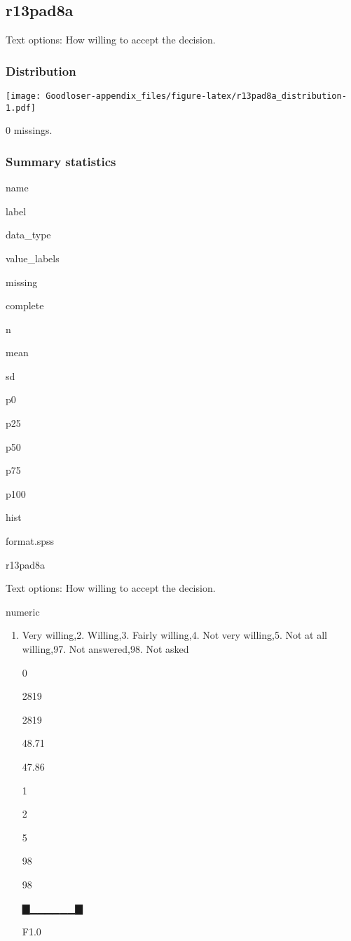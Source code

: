 \documentclass[]{book}
\providecommand{\tightlist}{%
  \setlength{\itemsep}{0pt}\setlength{\parskip}{0pt}}
\begin{document}
\subsection{r13pad8a}\label{r13pad8a}

Text options: How willing to accept the decision.

\subsubsection{Distribution}\label{r13pad8a_distribution}

\texttt{[image: Goodloser-appendix\_files/figure-latex/r13pad8a\_distribution-1.pdf]}

0 missings.

\subsubsection{Summary statistics}\label{r13pad8a_summary}

name

label

data\_type

value\_labels

missing

complete

n

mean

sd

p0

p25

p50

p75

p100

hist

format.spss

r13pad8a

Text options: How willing to accept the decision.

numeric

\begin{enumerate}
\def\labelenumi{\arabic{enumi}.}
\tightlist
\item
  Very willing,2. Willing,3. Fairly willing,4. Not very willing,5. Not
  at all willing,97. Not answered,98. Not asked

  0

  2819

  2819

  48.71

  47.86

  1

  2

  5

  98

  98

  ▇▁▁▁▁▁▁▇

  F1.0
\end{enumerate}
\end{document}
